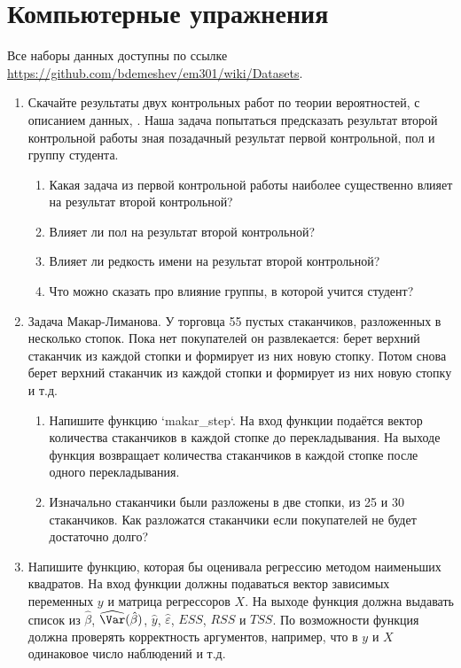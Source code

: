 \documentclass[pdftex,12pt,a4paper]{article}
\def \hb{\hat{\beta}}
\def \hy{\hat{y}}
\def \he{\hat{\varepsilon}}
\def \hVar{\widehat{\Var}}
\newcommand{\solution}[1]{}
\begin{document}
\section{Компьютерные упражнения}

Все наборы данных доступны по ссылке \url{https://github.com/bdemeshev/em301/wiki/Datasets}.


\begin{enumerate}


\item Скачайте результаты двух контрольных работ по теории вероятностей, \url{} с описанием данных, \url{}. Наша задача попытаться предсказать результат второй контрольной работы зная позадачный результат первой контрольной, пол и группу студента. 
\begin{enumerate}
\item Какая задача из первой контрольной работы наиболее существенно влияет на результат второй контрольной?
\item Влияет ли пол на результат второй контрольной?
\item Влияет ли редкость имени на результат второй контрольной?
\item Что можно сказать про влияние группы, в которой учится студент?
\end{enumerate}
\solution{}

\item Задача Макар-Лиманова. У торговца 55 пустых стаканчиков, разложенных в несколько стопок. Пока нет покупателей он развлекается: берет верхний стаканчик из каждой стопки и формирует из них новую стопку. Потом снова берет верхний стаканчик из каждой стопки и формирует из них новую стопку и т.д.
\begin{enumerate}
\item Напишите функцию `makar\_step`. На вход функции подаётся вектор количества стаканчиков в каждой стопке до перекладывания. На выходе функция возвращает количества стаканчиков в каждой стопке после одного перекладывания.
\item Изначально стаканчики были разложены в две стопки, из 25 и 30 стаканчиков. Как разложатся стаканчики если покупателей не будет достаточно долго?
\end{enumerate}
\solution{}

\item Напишите функцию, которая бы оценивала регрессию методом наименьших квадратов. На вход функции должны подаваться вектор зависимых переменных $y$ и матрица регрессоров $X$. На выходе функция должна выдавать список из $\hb$, $\hVar(\hb)$, $\hy$, $\he$, $ESS$, $RSS$ и $TSS$. По возможности функция должна проверять корректность аргументов, например, что в $y$ и $X$ одинаковое число наблюдений и т.д.
\solution{}


\end{enumerate}
\end{document}
